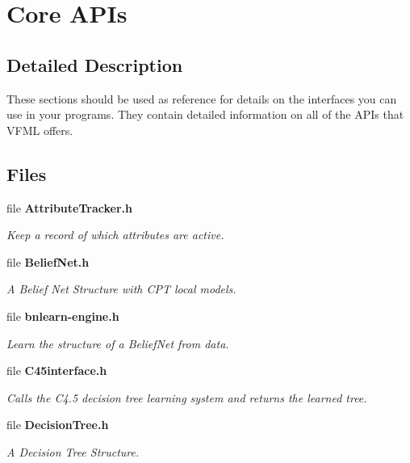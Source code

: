\section{Core APIs}
\label{group__CoreAPI}


\subsection{Detailed Description}
These sections should be used as reference for details on the interfaces you can use in your programs. They contain detailed information on all of the APIs that VFML offers. 

\subsection*{Files}
\begin{CompactItemize}
\item 
file {\bf Attribute\-Tracker.h}
\begin{CompactList}\small\item\em Keep a record of which attributes are active. \item\end{CompactList}

\item 
file {\bf Belief\-Net.h}
\begin{CompactList}\small\item\em A Belief Net Structure with CPT local models. \item\end{CompactList}

\item 
file {\bf bnlearn-engine.h}
\begin{CompactList}\small\item\em Learn the structure of a Belief\-Net from data. \item\end{CompactList}

\item 
file {\bf C45interface.h}
\begin{CompactList}\small\item\em Calls the C4.5 decision tree learning system and returns the learned tree. \item\end{CompactList}

\item 
file {\bf Decision\-Tree.h}
\begin{CompactList}\small\item\em A Decision Tree Structure. \item\end{CompactList}


\end{CompactItemize}

